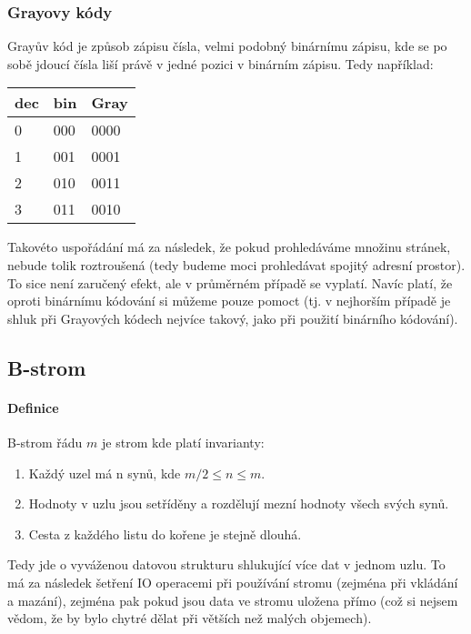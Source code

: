\documentclass[a4paper,12pt]{article}
\begin{document}
\subsubsection{Grayovy kódy}
\setcounter{equation}{0}
Grayův kód je způsob zápisu čísla, velmi podobný binárnímu zápisu, kde se po 
sobě jdoucí čísla liší právě v jedné pozici v binárním zápisu. Tedy například:
\begin{center}
\begin{tabular}{|l|l|l|}
\hline
	dec & bin & Gray \\
\hline
	0	& 000 & 0000 \\
\hline
	1   & 001 & 0001 \\
\hline
	2   & 010 & 0011 \\
\hline
	3   & 011 & 0010 \\
\hline
\end{tabular}
\end{center}
Takovéto uspořádání má za následek, že pokud prohledáváme množinu stránek, 
nebude tolik roztroušená (tedy budeme moci prohledávat spojitý adresní prostor).  
To sice není zaručený efekt, ale v průměrném případě se vyplatí. Navíc platí, že 
oproti binárnímu kódování si můžeme pouze pomoct (tj. v nejhorším případě je 
shluk při Grayových kódech nejvíce takový, jako při použití binárního kódování).


\subsection{B-strom}
\setcounter{equation}{0}
\paragraph{Definice}
B-strom řádu $m$ je strom kde platí invarianty:
\begin{enumerate}
	\item Každý uzel má n synů, kde $m/2 \leq n \leq m$.
	\item Hodnoty v uzlu jsou setříděny a rozdělují mezní hodnoty všech svých 
	synů.
	\item Cesta z každého listu do kořene je stejně dlouhá.
\end{enumerate}

Tedy jde o vyváženou datovou strukturu shlukující více dat v jednom uzlu. To má 
za následek šetření IO operacemi při používání stromu (zejména při vkládání a 
mazání), zejména pak pokud jsou data ve stromu uložena přímo (což si nejsem 
vědom, že by bylo chytré dělat při větších než malých objemech).
\end{document}
